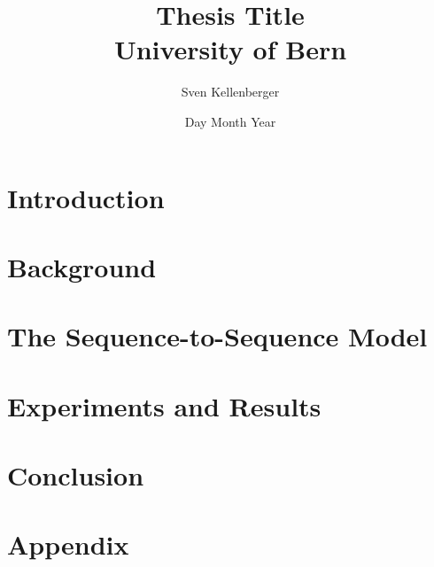 \documentclass[12pt, twoside]{report}
\begin{document}
\title{
	{Thesis Title}\\
	{\large University of Bern}
}
\author{Sven Kellenberger}
\date{Day Month Year}

\maketitle

\tableofcontents

\chapter{Introduction}


\chapter{Background}


\chapter{The Sequence-to-Sequence Model}


\chapter{Experiments and Results}


\chapter{Conclusion}


\appendix
\chapter{Appendix}

\end{document}

